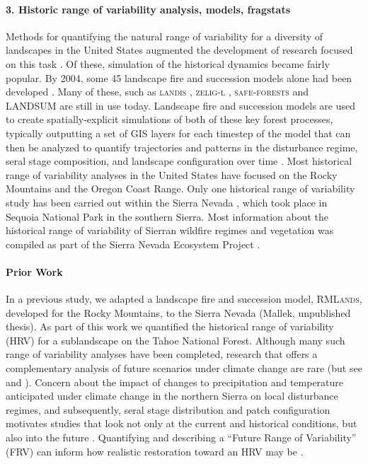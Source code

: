 \documentclass[12pt]{article}
\begin{document}
\begin{spacing}{1}
\paragraph{3. Historic range of variability analysis, models, fragstats}
Methods for quantifying the natural range of variability for a diversity of landscapes in the United States augmented the development of research focused on this task \citep{Landres1999}. Of these, simulation of the historical dynamics became fairly popular. By 2004, some 45 landscape fire and succession models alone had been developed \citep{Keane2004}. Many of these, such as \textsc{landis} \citep{He1999}, \textsc{zelig-l} \citep{Miller1999}, \textsc{safe-forests} \cite{Sessions1997} and LANDSUM \citep{Keane2012} are still in use today. Landscape fire and succession models are used to create spatially-explicit simulations of both of these key forest processes, typically outputting a set of GIS layers for each timestep of the model that can then be analyzed to quantify trajectories and patterns in the disturbance regime, seral stage composition, and landscape configuration over time \citep{Keane2004}. Most historical range of variability analyses in the United States have focused on the Rocky Mountains and the Oregon Coast Range. Only one historical range of variability study has been carried out within the Sierra Nevada \citep{Miller1999}, which took place in Sequoia National Park in the southern Sierra. Most information about the historical range of variability of Sierran wildfire regimes and vegetation was compiled as part of the Sierra Nevada Ecosystem Project \citep{SNEP1996a}. 

\paragraph{Prior Work}
In a previous study, we adapted a landscape fire and succession model, \textsc{RMLands}, developed for the Rocky Mountains, to the Sierra Nevada (Mallek, unpublished thesis). As part of this work we quantified the historical range of variability (HRV) for a sublandscape on the Tahoe National Forest. Although many such range of variability analyses have been completed, research that offers a complementary analysis of future scenarios under climate change are rare (but see \cite{Keane2008} and \cite{Duveneck2014}). Concern about the impact of changes to precipitation and temperature anticipated under climate change in the northern Sierra on local disturbance regimes, and subsequently, seral stage distribution and patch configuration motivates studies that look not only at the current and historical conditions, but also into the future \citep{Fule2008,North2012}. Quantifying and describing a ``Future Range of Variability'' (FRV) can inform how realistic restoration toward an HRV may be \citep{Duncan2010}.


\end{spacing}
\end{document}
